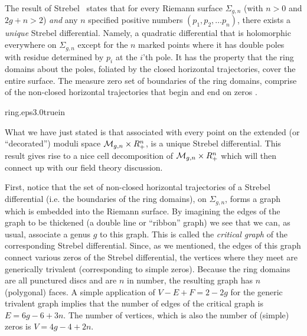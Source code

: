 The result of Strebel \streb\ states that for every Riemann surface 
$\Sigma_{g,n}$ (with $n>0$ and $2g+n>2$) {\it and} any 
$n$ specified positive numbers
$(p_1,p_2,\ldots p_n)$, there exists a {\it unique} 
Strebel differential. Namely, a quadratic differential that 
is holomorphic everywhere on $\Sigma_{g,n}$ except for the 
$n$ marked points where it has double poles with residue determined by
$p_i$ at the $i$'th pole. It has the property that the ring domains about 
the poles, foliated by the closed horizontal trajectories, cover 
the entire surface. The measure zero set of boundaries 
of the ring domains, comprise of the non-closed 
horizontal trajectories 
that begin and end on zeros .

%
{ring.eps}{3.0truein}
%




What we have just stated is that
associated with every point on the extended (or ``decorated'') moduli space
${\cal M}_{g,n}\times R_{+}^n$, is a unique Strebel differential. 
This result gives rise to a nice cell decomposition of 
${\cal M}_{g,n}\times R_{+}^n$ which will then connect up with our
field theory discussion. 

First, notice that the set of non-closed horizontal trajectories of a 
Strebel differential (i.e. the boundaries of the ring domains), on 
$\Sigma_{g,n}$,
forms a graph which is embedded into the Riemann surface. 
By imagining the edges of the graph to be thickened (a double line or 
``ribbon'' graph)
we see that we can, as usual, associate a genus $g$ to this graph. 
This is called the {\it critical graph} of the corresponding Strebel
differential.   
Since,
as we mentioned, the edges of this graph connect various zeros 
of the Strebel differential, the vertices where they meet
are generically trivalent (corresponding to simple zeros). Because the 
ring domains are all punctured discs and are $n$ in number, the resulting 
graph has $n$ (polygonal) faces. A simple application of $V-E+F=2-2g$ for the 
generic trivalent graph implies that the number of edges of the 
critical graph is $E=6g-6+3n$. The number of vertices, which is also
the number of (simple) zeros is $V=4g-4+2n$. 

